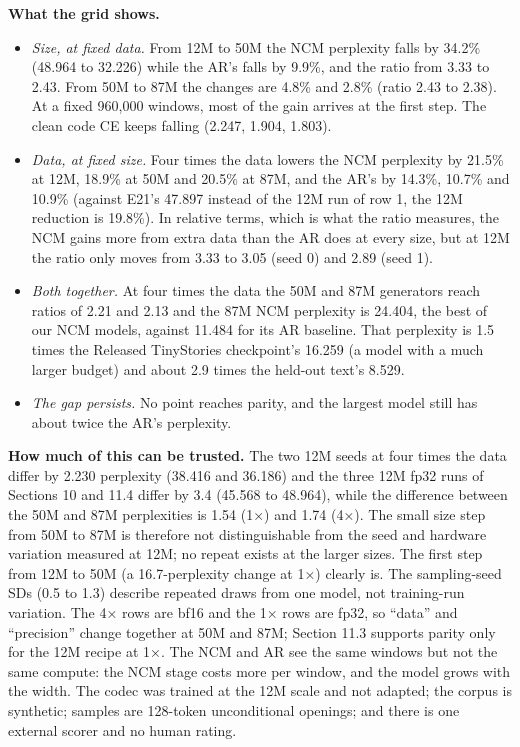\documentclass[
  british,
]{article}
\providecommand{\tightlist}{%
  \setlength{\itemsep}{0pt}\setlength{\parskip}{0pt}}
\begin{document}
\textbf{What the grid shows.}

\begin{itemize}
\tightlist
\item
  \emph{Size, at fixed data.} From 12M to 50M the NCM perplexity falls
  by 34.2\% (48.964 to 32.226) while the AR's falls by 9.9\%, and the
  ratio from 3.33 to 2.43. From 50M to 87M the changes are 4.8\% and
  2.8\% (ratio 2.43 to 2.38). At a fixed 960,000 windows, most of the
  gain arrives at the first step. The clean code CE keeps falling
  (2.247, 1.904, 1.803).
\item
  \emph{Data, at fixed size.} Four times the data lowers the NCM
  perplexity by 21.5\% at 12M, 18.9\% at 50M and 20.5\% at 87M, and the
  AR's by 14.3\%, 10.7\% and 10.9\% (against E21's 47.897 instead of the
  12M run of row 1, the 12M reduction is 19.8\%). In relative terms,
  which is what the ratio measures, the NCM gains more from extra data
  than the AR does at every size, but at 12M the ratio only moves from
  3.33 to 3.05 (seed 0) and 2.89 (seed 1).
\item
  \emph{Both together.} At four times the data the 50M and 87M
  generators reach ratios of 2.21 and 2.13 and the 87M NCM perplexity is
  24.404, the best of our NCM models, against 11.484 for its AR
  baseline. That perplexity is 1.5 times the Released TinyStories
  checkpoint's 16.259 (a model with a much larger budget) and about 2.9
  times the held-out text's 8.529.
\item
  \emph{The gap persists.} No point reaches parity, and the largest
  model still has about twice the AR's perplexity.
\end{itemize}

\textbf{How much of this can be trusted.} The two 12M seeds at four
times the data differ by 2.230 perplexity (38.416 and 36.186) and the
three 12M fp32 runs of Sections 10 and 11.4 differ by 3.4 (45.568 to
48.964), while the difference between the 50M and 87M perplexities is
1.54 (1×) and 1.74 (4×). The small size step from 50M to 87M is
therefore not distinguishable from the seed and hardware variation
measured at 12M; no repeat exists at the larger sizes. The first step
from 12M to 50M (a 16.7-perplexity change at 1×) clearly is. The
sampling-seed SDs (0.5 to 1.3) describe repeated draws from one model,
not training-run variation. The 4× rows are bf16 and the 1× rows are
fp32, so ``data'' and ``precision'' change together at 50M and 87M;
Section 11.3 supports parity only for the 12M recipe at 1×. The NCM and
AR see the same windows but not the same compute: the NCM stage costs
more per window, and the model grows with the width. The codec was
trained at the 12M scale and not adapted; the corpus is synthetic;
samples are 128-token unconditional openings; and there is one external
scorer and no human rating.
\end{document}
